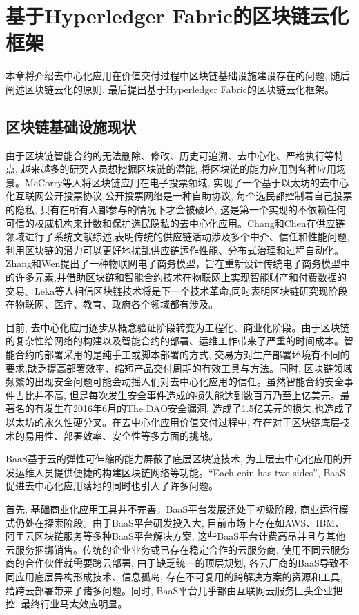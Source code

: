 \chapter{基于Hyperledger Fabric的区块链云化框架}

本章将介绍去中心化应用在价值交付过程中区块链基础设施建设存在的问题, 随后阐述区块链云化的原则, 最后提出基于Hyperledger Fabric的区块链云化框架。

\section{区块链基础设施现状}

由于区块链智能合约的无法删除、修改、历史可追溯、去中心化、严格执行等特点, 越来越多的研究人员想挖掘区块链的潜能, 将区块链的能力应用到各种应用场景。McCorry等人\cite{mccorry2017smart}将区块链应用在电子投票领域, 实现了一个基于以太坊的去中心化互联网公开投票协议,公开投票网络是一种自助协议, 每个选民都控制着自己投票的隐私, 只有在所有人都参与的情况下才会被破坏, 这是第一个实现的不依赖任何可信的权威机构来计数和保护选民隐私的去中心化应用。Chang和Chen\cite{chang2020blockchain}在供应链领域进行了系统文献综述,表明传统的供应链活动涉及多个中介、信任和性能问题,利用区块链的潜力可以更好地扰乱供应链运作性能、分布式治理和过程自动化。Zhang和Wen\cite{zhang2017iot}提出了一种物联网电子商务模型，旨在重新设计传统电子商务模型中的许多元素,并借助区块链和智能合约技术在物联网上实现智能财产和付费数据的交易。Leka等人\cite{leka2019systematic}相信区块链技术将是下一个技术革命,同时表明区块链研究现阶段在物联网\cite{christidis2016blockchains}、医疗、教育、政府各个领域都有涉及。

目前, 去中心化应用逐步从概念验证阶段转变为工程化、商业化阶段。由于区块链的复杂性给网络的构建以及智能合约的部署、运维工作带来了严重的时间成本。智能合约的部署采用的是纯手工或脚本部署的方式, 交易方对生产部署环境有不同的要求,缺乏提高部署效率、缩短产品交付周期的有效工具与方法。同时, 区块链领域频繁的出现安全问题可能会动摇人们对去中心化应用的信任。虽然智能合约安全事件占比并不高, 但是每次发生安全事件造成的损失能达到数百万乃至上亿美元。最著名的有发生在2016年6月的The DAO\cite{zhao2017dao}安全漏洞, 造成了1.5亿美元的损失,也造成了以太坊的永久性硬分叉。在去中心化应用价值交付过程中, 存在对于区块链底层技术的易用性、部署效率、安全性等多方面的挑战。

BaaS基于云的弹性可伸缩的能力屏蔽了底层区块链技术, 为上层去中心化应用的开发运维人员提供便捷的构建区块链网络等功能。“Each coin has two sides”, BaaS促进去中心化应用落地的同时也引入了许多问题。

首先, 基础商业化应用工具并不完善。BaaS平台发展还处于初级阶段, 商业运行模式仍处在探索阶段。由于BaaS平台研发投入大, 目前市场上存在如AWS、IBM、阿里云区块链服务等多种BaaS平台解决方案, 这些BaaS平台计费高昂\footnotemark[1]并且与其他云服务捆绑销售。传统的企业业务或已存在稳定合作的云服务商, 使用不同云服务商的合作伙伴就需要跨云部署, 由于缺乏统一的顶层规划, 各云厂商的BaaS导致不同应用底层异构形成技术、信息孤岛, 存在不可复用的跨解决方案的资源和工具, 给跨云部署带来了诸多问题。同时, BaaS平台几乎都由互联网云服务巨头企业把控, 最终行业马太效应明显\cite{KuernetesbasedFabricChaincodeManagementAndHihgAvailabilityTechnology}。

